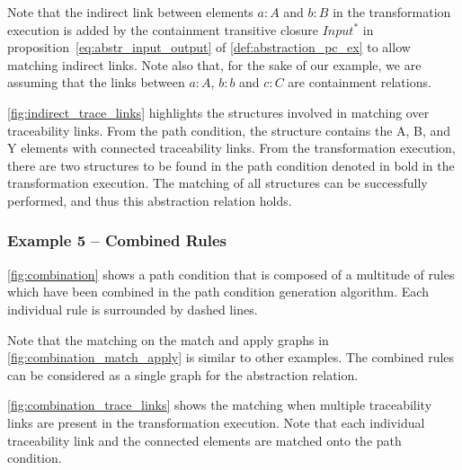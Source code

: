 Note that the indirect link between elements $a:A$ and $b:B$ in the transformation execution is added by the containment transitive closure $Input^{*}$ in proposition~\ref{eq:abstr_input_output} of \cref{def:abstraction_pc_ex} to allow matching indirect links. Note also that, for the sake of our example, we are assuming that the links between $a:A$, $b:b$ and $c:C$ are containment relations.

\cref{fig:indirect_trace_links} highlights the structures involved in matching over traceability links. From the path condition, the structure contains the A, B, and Y elements with connected traceability links. From the transformation execution, there are two structures to be found in the path condition denoted in bold in the transformation execution. The matching of all structures can be successfully performed, and thus this abstraction relation holds.





\subsubsection{Example 5 -- Combined Rules}



\cref{fig:combination} shows a path condition that is composed of a multitude of rules which have been combined in the path condition generation algorithm. Each individual rule is surrounded by dashed lines.

Note that the matching on the match and apply graphs in \cref{fig:combination_match_apply} is similar to other examples. The combined rules can be considered as a single graph for the abstraction relation.

\cref{fig:combination_trace_links} shows the matching when multiple traceability links are present in the transformation execution. Note that each individual traceability link and the connected elements are matched onto the path condition.

